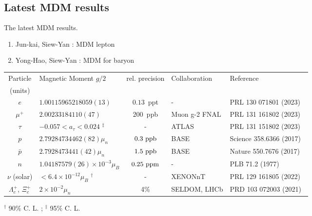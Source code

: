 \documentclass[12pt]{article}
\begin{document}
\newpage 
\begin{landscape}
\section{Latest MDM results}

\noindent The latest MDM results.
\begin{enumerate}
\item Jun-kai, Siew-Yan : MDM lepton
\item Yong-Hao, Siew-Yan  : MDM for baryon
\end{enumerate}

\begin{table}[ht]
\begin{center}
\begin{tabular}{|c|l|c|l|l|}
\hline \hline
Particle & Magnetic Moment $g/2$ & rel. precision  & Collaboration  & Reference \\ 
(units)  & &  &  &  \\ 
\hline
$e$ & $1.00115965218059(13)$ & $0.13$~ppt  & - & PRL 130 071801 (2023)~\cite{PhysRevLett.130.071801}  \\ \hline
$\mu^{+}$ & $2.00233184110(47)$ & $200$~ppb & Muon g-2 FNAL  & PRL 131 161802 (2023)~\cite{PhysRevLett.131.161802}   \\ \hline
$\tau$ & $-0.057<a_{\tau}<0.024$ ${}^{\ddagger}$ & - & ATLAS & PRL 131 151802 (2023)~\cite{PhysRevLett.131.151802}  \\ \hline
$p$ & $2.79284734462(82)\mu_n$ & $\rm 0.3~ppb$ & BASE  & Science 358.6366 (2017)~\cite{pMDM} \\ \hline
$\bar{p}$ & $2.7928473441(42)\mu_n$ & $\rm 1.5~ppb$ & BASE & Nature 550.7676 (2017)~\cite{pbarMDM} \\ \hline
$n$ & $1.04187579(26) \times 10^{-3} \mu_{B}$ & $\rm 0.25~ppm$ & - & PLB 71.2 (1977)~\cite{GREENE1977297}  \\ \hline
$\nu$ (solar) & $<6.4 \times 10^{-12} \mu_{B}$ ${}^{\dagger}$ & - & XENONnT &  PRL 129 161805 (2022)~\cite{PhysRevLett.129.161805} \\ \hline
$\Lambda^+_c$, $\Xi^+_c$ & $2\times10^{-2}\mu_n$ & 4\% &SELDOM, LHCb & PRD 103 072003 (2021)~\cite{charmBaryons}\\ \hline
\hline
\hline
\end{tabular}
\end{center}
${}^{\dagger}$ 90\% C. L. ; ${}^{\ddagger}$ 95\% C. L.
\end{table}
\end{landscape}

%
\printbibliography
\end{document}
